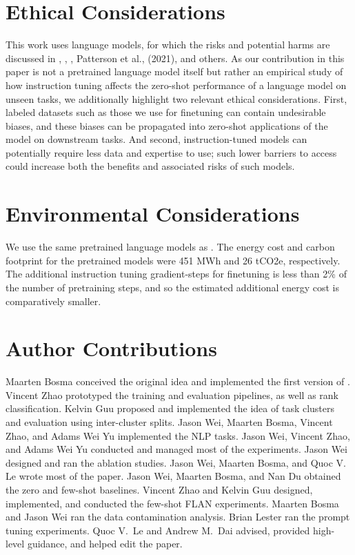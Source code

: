 \section*{Ethical Considerations}
This work uses language models, for which the risks and potential harms are discussed in \citet{bender-koller-2020-climbing}, \citet{brown2020language}, \citet{10.1145/3442188.3445922}, Patterson et al., (2021), and others. As our contribution in this paper is not a pretrained language model itself but rather an empirical study of how instruction tuning affects the zero-shot performance of a language model on unseen tasks, we additionally highlight two relevant ethical considerations. First, labeled datasets such as those we use for finetuning can contain undesirable biases, and these biases can be propagated into zero-shot applications of the model on downstream tasks.  And second, instruction-tuned models can potentially require less data and expertise to use; such lower barriers to access could increase both the benefits and associated risks of such models.

\section*{Environmental Considerations}
We use the same pretrained language models as \citet{Austin2021ProgramSW}. %
The energy cost and carbon footprint for the pretrained models were 451 MWh and 26 tCO2e, respectively. 
The additional instruction tuning gradient-steps for finetuning \flan{} is less than 2\% of the number of pretraining steps, and so the estimated additional energy cost is comparatively smaller.

\section*{Author Contributions}\label{sec:contributions}
Maarten Bosma conceived the original idea and implemented the first version of \flan. 
Vincent Zhao prototyped the training and evaluation pipelines, as well as rank classification. 
Kelvin Guu proposed and implemented the idea of task clusters and evaluation using inter-cluster splits. 
Jason Wei, Maarten Bosma, Vincent Zhao, and Adams Wei Yu implemented the NLP tasks. 
Jason Wei, Vincent Zhao, and Adams Wei Yu conducted and managed most of the experiments. 
Jason Wei designed and ran the ablation studies. 
Jason Wei, Maarten Bosma, and Quoc V. Le wrote most of the paper. 
Jason Wei, Maarten Bosma, and Nan Du obtained the zero and few-shot baselines. 
Vincent Zhao and Kelvin Guu designed, implemented, and conducted the few-shot FLAN experiments.
Maarten Bosma and Jason Wei ran the data contamination analysis.
Brian Lester ran the prompt tuning experiments. 
Quoc V.~Le and Andrew M.~Dai advised, provided high-level guidance, and helped edit the paper.

